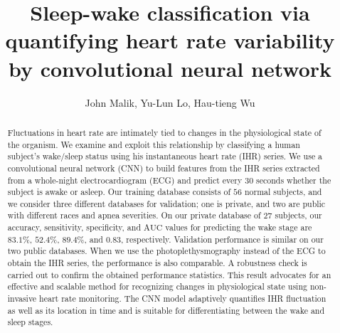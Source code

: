 \documentclass[10pt,a4paper,english]{amsart}
\begin{document}
 

\title[Sleep-wake classification via quantifying HRV by CNN]{Sleep-wake classification via quantifying heart rate variability by convolutional neural network}

\author{John Malik, Yu-Lun Lo, Hau-tieng Wu}



\maketitle



\begin{abstract}
Fluctuations in heart rate are intimately tied to changes in the physiological state of the organism. We examine and exploit this relationship by classifying a human subject's wake/sleep status using his instantaneous heart rate (IHR) series. 
We use a convolutional neural network (CNN) to build features from the IHR series extracted from a whole-night electrocardiogram (ECG) and predict every $30$ seconds whether the subject is awake or asleep. 
%
Our training database consists of $56$ normal subjects, and we consider three different databases for validation; one is private, and two are public with different races and apnea severities.
On our private database of $27$ subjects, our accuracy, sensitivity, specificity, and $\mathrm{AUC}$ values for predicting the wake stage are $83.1 \%$, $52.4\%$, $89.4\%$, and $0.83$, respectively. Validation performance is similar on our two public databases. When we use the photoplethysmography instead of the ECG to obtain the IHR series, the performance is also comparable. A robustness check is carried out to confirm the obtained performance statistics. 
This result advocates for an effective and scalable method for recognizing changes in physiological state using non-invasive heart rate monitoring. The CNN model adaptively quantifies IHR fluctuation as well as its location in time and is suitable for differentiating between the wake and sleep stages.
\end{abstract} 
\end{document}
